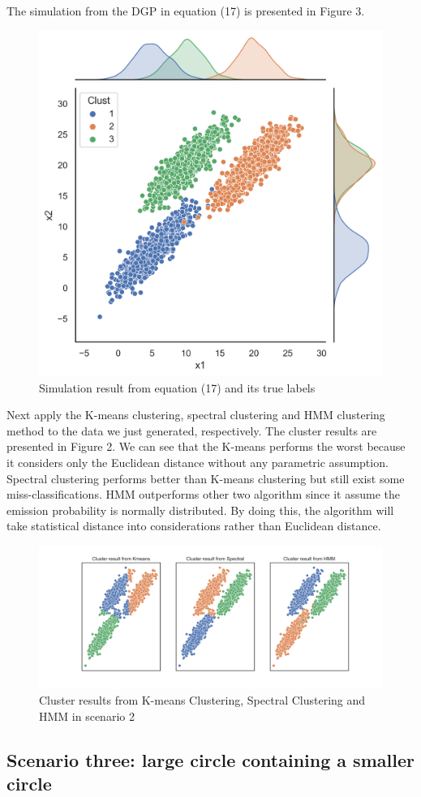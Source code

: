 \documentclass[a4paper]{article}
\begin{document}
\

The simulation from the DGP in equation (17) is presented in Figure 3. 

\begin{figure}[h!]
  \centering
  \includegraphics[width=0.45\linewidth]{../Simu_results/sen2.png}
  \caption{Simulation result from equation (17) and its true labels}
  \label{fig:sec}
\end{figure}

Next apply the K-means clustering, spectral clustering and HMM clustering method to the data we just generated, respectively. The cluster results are presented in Figure 2. We can see that the K-means performs the worst because it considers only the Euclidean distance without any parametric assumption. Spectral clustering performs better than K-means clustering but still exist some miss-classifications. HMM outperforms other two algorithm since it assume the emission probability is normally distributed. By doing this, the algorithm will take statistical distance into considerations rather than Euclidean distance.

\begin{figure}[h!]
  \centering
  \includegraphics[width=0.8\linewidth]{../Simu_results/sen2_clust.png}
  \caption{Cluster results from K-means Clustering, Spectral Clustering and HMM in scenario 2}
  \label{fig:sec}
\end{figure}

\subsection{Scenario three:  large circle containing a smaller circle}
\end{document}
